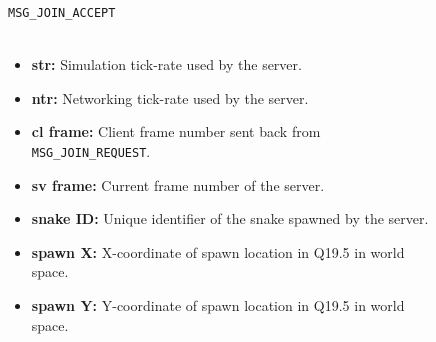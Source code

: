 \vspace{1.5em}

\begin{figure}[h]
\verb$MSG_JOIN_ACCEPT$\\
\vspace{.25em}\\

\begin{itemize}
    \item\textbf{str:} Simulation tick-rate used by the server.
    \item\textbf{ntr:} Networking tick-rate used by the server.
    \item\textbf{cl frame:} Client frame number sent back from \verb$MSG_JOIN_REQUEST$.
    \item\textbf{sv frame:} Current frame number of the server.
    \item\textbf{snake ID:} Unique identifier of the snake spawned by the server.
    \item\textbf{spawn X:} X-coordinate of spawn location in Q19.5 in world space.
    \item\textbf{spawn Y:} Y-coordinate of spawn location in Q19.5 in world space.
\end{itemize}
\end{figure}
